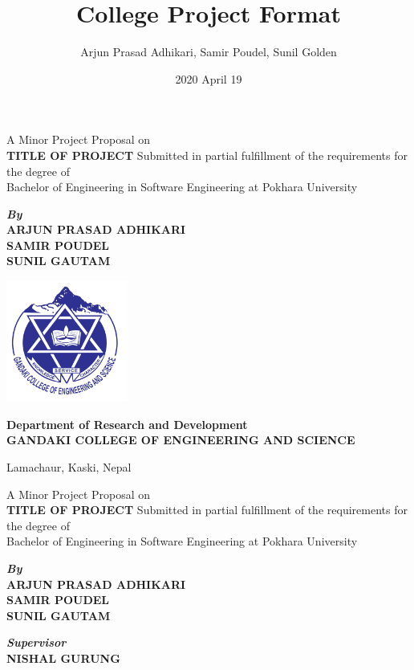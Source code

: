 \documentclass[a4paper, 14pt]{report}
\title{College Project Format}
\author{Arjun Prasad Adhikari, Samir Poudel, Sunil Golden}
\date{2020 April 19}
\begin{document}
	\begin{titlepage}
		\begin{center}
			A Minor Project Proposal on \\
			\textbf{TITLE OF PROJECT}
			\vskip1cm
			Submitted in partial fulfillment of the requirements for the degree of \\ 
Bachelor of Engineering in Software Engineering at Pokhara University
			
			
			\vskip1.5cm
			
			\textbf{\textit{By\\}}
			\textbf{ARJUN PRASAD ADHIKARI \\ SAMIR POUDEL \\ SUNIL GAUTAM}
			
			\vskip2cm
			
			\includegraphics[width=4cm]{gces.png}
			
			\vskip1cm
			
			\textbf{Department of Research and Development \\ GANDAKI COLLEGE OF ENGINEERING AND SCIENCE}
			
			Lamachaur, Kaski, Nepal
			
			\newpage
			
			A Minor Project Proposal on \\
			\textbf{TITLE OF PROJECT}
			\vskip1cm
			Submitted in partial fulfillment of the requirements for the degree of \\ 
Bachelor of Engineering in Software Engineering at Pokhara University
			
			
			\vskip1.5cm
			
			\textbf{\textit{By\\}}
			\textbf{ARJUN PRASAD ADHIKARI \\ SAMIR POUDEL \\ SUNIL GAUTAM}
			
			\vskip1cm
			
			\textbf{\textit{Supervisor}}
			\textbf{\\ NISHAL GURUNG}			
			

\end{center}
\end{titlepage}
\end{document}

